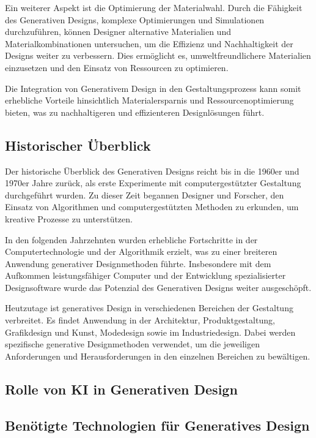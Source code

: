 Ein weiterer Aspekt ist die Optimierung der Materialwahl. Durch die Fähigkeit des Generativen Designs, komplexe Optimierungen und Simulationen durchzuführen, können Designer alternative Materialien und Materialkombinationen untersuchen, um die Effizienz und Nachhaltigkeit der Designs weiter zu verbessern. Dies ermöglicht es, umweltfreundlichere Materialien einzusetzen und den Einsatz von Ressourcen zu optimieren.

Die Integration von Generativem Design in den Gestaltungsprozess kann somit erhebliche Vorteile hinsichtlich Materialersparnis und Ressourcenoptimierung bieten, was zu nachhaltigeren und effizienteren Designlösungen führt. \autocite*{20}

\subsection*{Historischer Überblick}
Der historische Überblick des Generativen Designs reicht bis in die 1960er und 1970er Jahre zurück, als erste Experimente mit computergestützter Gestaltung durchgeführt wurden. Zu dieser Zeit begannen Designer und Forscher, den Einsatz von Algorithmen und computergestützten Methoden zu erkunden, um kreative Prozesse zu unterstützen.

In den folgenden Jahrzehnten wurden erhebliche Fortschritte in der Computertechnologie und der Algorithmik erzielt, was zu einer breiteren Anwendung generativer Designmethoden führte. Insbesondere mit dem Aufkommen leistungsfähiger Computer und der Entwicklung spezialisierter Designsoftware wurde das Potenzial des Generativen Designs weiter ausgeschöpft.

Heutzutage ist generatives Design in verschiedenen Bereichen der Gestaltung verbreitet. Es findet Anwendung in der Architektur, Produktgestaltung, Grafikdesign und Kunst, Modedesign sowie im Industriedesign. Dabei werden spezifische generative Designmethoden verwendet, um die jeweiligen Anforderungen und Herausforderungen in den einzelnen Bereichen zu bewältigen. \autocite*{18}

\subsection*{Rolle von KI in Generativen Design}

\subsection*{Benötigte Technologien für Generatives Design}